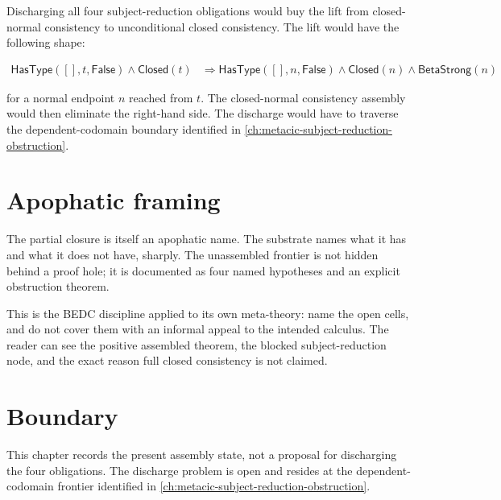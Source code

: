 Discharging all four subject-reduction obligations would buy the lift from
closed-normal consistency to unconditional closed consistency. The lift would
have the following shape:

$$
\begin{aligned}
  \mathsf{HasType}([],t,\mathsf{False})
  \wedge
  \mathsf{Closed}(t)
  &\Rightarrow
  \mathsf{HasType}([],n,\mathsf{False})
  \wedge
  \mathsf{Closed}(n)
  \wedge
  \mathsf{BetaStrong}(n)
\end{aligned}
$$

for a normal endpoint $n$ reached from $t$. The closed-normal consistency
assembly would then eliminate the right-hand side. The discharge would have to
traverse the dependent-codomain boundary identified in
\autoref{ch:metacic-subject-reduction-obstruction}.

\section{Apophatic framing}
\label{sec:closed-metacic-consistency-assembly-apophatic-framing}

The partial closure is itself an apophatic name. The substrate names what it has
and what it does not have, sharply. The unassembled frontier is not hidden
behind a proof hole; it is documented as four named hypotheses and an explicit
obstruction theorem.

This is the BEDC discipline applied to its own meta-theory: name the open cells,
and do not cover them with an informal appeal to the intended calculus. The
reader can see the positive assembled theorem, the blocked subject-reduction
node, and the exact reason full closed consistency is not claimed.


\section{Boundary}
\label{sec:closed-metacic-consistency-assembly-boundary}

This chapter records the present assembly state, not a proposal for discharging
the four obligations. The discharge problem is open and resides at the
dependent-codomain frontier identified in
\autoref{ch:metacic-subject-reduction-obstruction}.


